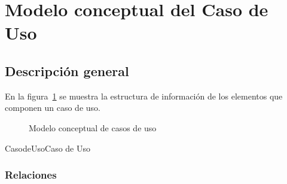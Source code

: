\section{Modelo conceptual del Caso de Uso}

\subsection{Descripción general}
En la figura~\ref{fig:conceptualProyectos} se muestra la estructura de información de los elementos que componen un caso de uso.
 
\begin{figure}[htbp!]
	\begin{center}
		\caption{Modelo conceptual de casos de uso}
		\label{fig:conceptualProyectos}
	\end{center}
\end{figure}



\begin{BusinessEntity}{CasodeUso}{Caso de Uso}
\end{BusinessEntity}

\subsubsection{Relaciones}

